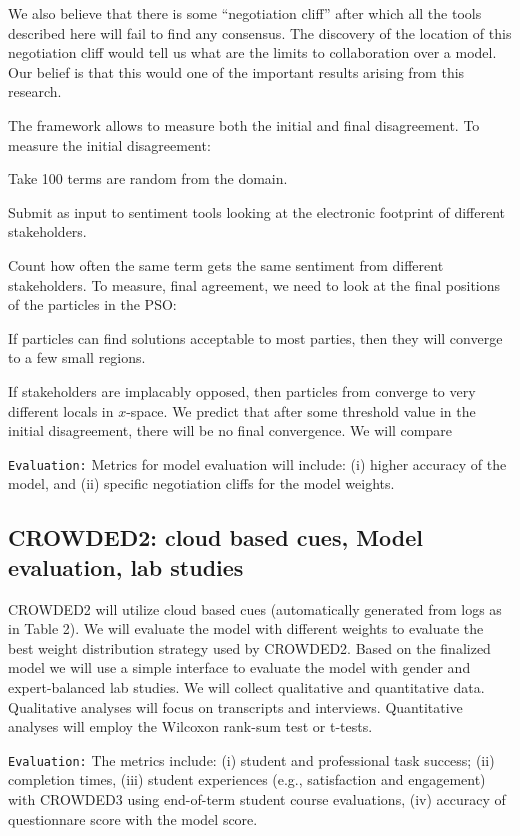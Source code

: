 We also believe that there is some ``negotiation cliff'' after which all the tools described here will fail to find any consensus. The discovery of the location of this negotiation cliff would tell us what are the limits to collaboration over a model. Our belief is that this would  one of the important results     arising from this research.

The   framework   allows to measure both the initial and final disagreement.
To measure the  initial disagreement:
\bi
\item
Take 100 terms are random from the domain.
\item
Submit as input to sentiment tools looking at the electronic footprint of different stakeholders.
\item
Count how often the same term gets the same sentiment from different stakeholders.
\ei
To measure, final agreement, we need to look at the final positions of the particles in the PSO:
\bi
\item If   particles can   find solutions acceptable to most parties, then  they will converge to a few small regions.
\item
 If    stakeholders are implacably opposed, then   particles from converge
 to very different locals in $x$-space.
\ei
We predict that after some threshold value in the initial disagreement, there will be no final convergence. We will compare 

{\tt Evaluation:} Metrics for model evaluation will include: (i) higher accuracy of the model, and (ii) specific negotiation cliffs for the model weights.

\subsection{CROWDED2: cloud based cues, Model evaluation, lab studies}

CROWDED2 will utilize cloud based cues (automatically generated from logs as in Table 2). We will evaluate the model with different weights to evaluate the best weight distribution strategy used by CROWDED2. Based on the finalized model we will use a simple interface to evaluate the model with gender and expert-balanced lab studies. We will collect qualitative and quantitative data.  Qualitative analyses will focus on transcripts and interviews. Quantitative analyses will employ the Wilcoxon rank-sum test or t-tests.

{\tt Evaluation:} The metrics include: (i) student and professional task success; (ii) completion times, (iii) student experiences (e.g., satisfaction and engagement) with CROWDED3 using end-of-term student course evaluations, (iv) accuracy of questionnare score with the model score.


